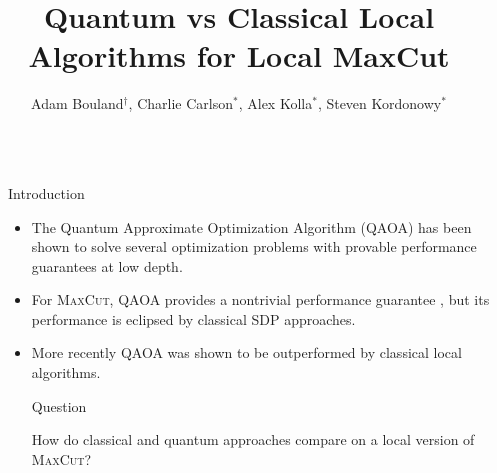 \documentclass[final]{beamer}
\title{Quantum vs Classical Local Algorithms for Local MaxCut}
\author{\texorpdfstring{Adam Bouland$^\dagger$, Charlie Carlson$^*$, Alex Kolla$^*$, Steven Kordonowy$^*$}{Foo}}
\institute{University of Colorado - Boulder ($^*$), Stanford University ($^\dagger$)}
\newlength{\sepwid}
\newlength{\onecolwid}
\begin{document}
  

\setlength{\belowcaptionskip}{2ex} %
\setlength\belowdisplayshortskip{2ex} %

\begin{frame}[t] %
\begin{columns}[t] %

\begin{column}{\sepwid}\end{column} %

\begin{column}{\onecolwid}\vspace{-.8in} %



\begin{block}{Introduction}

    \begin{itemize}
        \item The Quantum Approximate Optimization Algorithm (QAOA) has been shown to solve several optimization problems with provable performance guarantees at low depth. \cite{qaoa1,farhi2020quantum}
        \item For \textsc{MaxCut}, QAOA provides a nontrivial performance guarantee \cite{qaoa1}, but its performance is eclipsed by classical SDP approaches. \cite{gw}
        \item More recently QAOA was shown to be outperformed by classical local algorithms. \cite{Hastings}
        \vspace{.6in}
        \begin{alertblock}{
          Question
          }

            How do classical and quantum approaches compare on a local version of \textsc{MaxCut}?
        

\end{alertblock}
\end{itemize}
\end{block}
\end{column}
\end{columns}
\end{frame}
\end{document}
